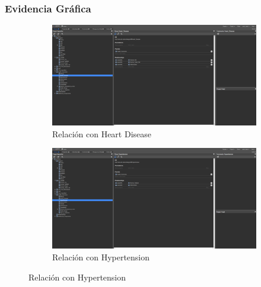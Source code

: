 \documentclass[12pt,a4paper]{article}
\begin{document}
\subsubsection{Evidencia Gráfica}

\begin{figure}[H]
    \centering
    \begin{subfigure}[b]{0.45\textwidth}
        \includegraphics[width=\textwidth]{screenshots/inflammation_1.png}
        \caption{Relación con Heart Disease}
    \end{subfigure}
    \hfill
    \begin{subfigure}[b]{0.45\textwidth}
        \includegraphics[width=\textwidth]{screenshots/inflammation_2.png}
        \caption{Relación con Hypertension}
    \end{subfigure}
    
    \vspace{0.5cm}
    

\end{figure}
\end{document}
